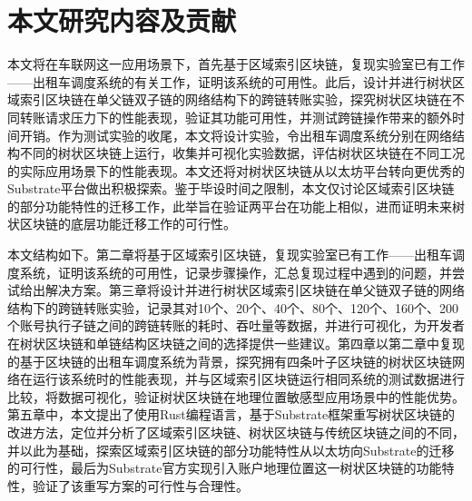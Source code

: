 \section{本文研究内容及贡献}

本文将在车联网这一应用场景下，首先基于区域索引区块链，复现实验室已有工作——出租车调度系统的有关工作，证明该系统的可用性。此后，设计并进行树状区域索引区块链在单父链双子链的网络结构下的跨链转账实验，探究树状区块链在不同转账请求压力下的性能表现，验证其功能可用性，并测试跨链操作带来的额外时间开销。作为测试实验的收尾，本文将设计实验，令出租车调度系统分别在网络结构不同的树状区块链上运行，收集并可视化实验数据，评估树状区块链在不同工况的实际应用场景下的性能表现。本文还将对树状区块链从以太坊平台转向更优秀的Substrate平台做出积极探索。鉴于毕设时间之限制，本文仅讨论区域索引区块链的部分功能特性的迁移工作，此举旨在验证两平台在功能上相似，进而证明未来树状区块链的底层功能迁移工作的可行性。

本文结构如下。第二章将基于区域索引区块链，复现实验室已有工作——出租车调度系统，证明该系统的可用性，记录步骤操作，汇总复现过程中遇到的问题，并尝试给出解决方案。第三章将设计并进行树状区域索引区块链在单父链双子链的网络结构下的跨链转账实验，记录其对10个、20个、40个、80个、120个、160个、200个账号执行子链之间的跨链转账的耗时、吞吐量等数据，并进行可视化，为开发者在树状区块链和单链结构区块链之间的选择提供一些建议。第四章以第二章中复现的基于区块链的出租车调度系统为背景，探究拥有四条叶子区块链的树状区块链网络在运行该系统时的性能表现，并与区域索引区块链运行相同系统的测试数据进行比较，将数据可视化，验证树状区块链在地理位置敏感型应用场景中的性能优势。第五章中，本文提出了使用Rust编程语言，基于Substrate框架重写树状区块链的改进方法，定位并分析了区域索引区块链、树状区块链与传统区块链之间的不同，并以此为基础，探索区域索引区块链的部分功能特性从以太坊向Substrate的迁移的可行性，最后为Substrate官方实现引入账户地理位置这一树状区块链的功能特性，验证了该重写方案的可行性与合理性。







